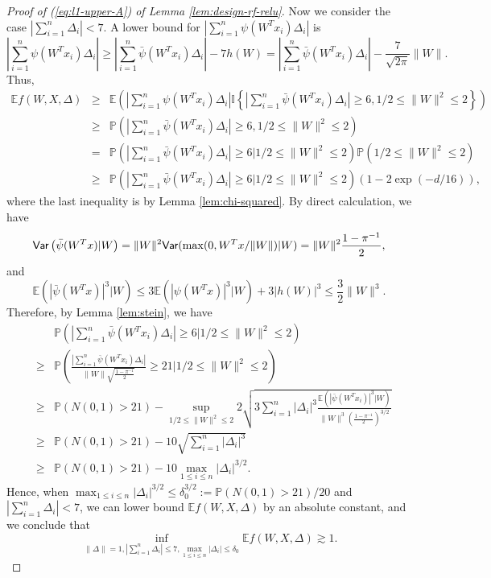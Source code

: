 \begin{proof}[Proof of (\ref{eq:l1-upper-A}) of Lemma \ref{lem:design-rf-relu}]
Now we consider the case $\left|\sum_{i=1}^n\Delta_i\right|< 7$. A lower bound for $\left|\sum_{i=1}^n\psi(W^Tx_i)\Delta_i\right|$ is
\begin{equation}
\left|\sum_{i=1}^n\psi(W^Tx_i)\Delta_i\right| \geq \left|\sum_{i=1}^n\bar{\psi}(W^Tx_i)\Delta_i\right| - 7h(W) = \left|\sum_{i=1}^n\bar{\psi}(W^Tx_i)\Delta_i\right| - \frac{7}{\sqrt{2\pi}}\|W\|. \label{eq:seven}
\end{equation}
Thus,
\begin{eqnarray*}
 \mathbb{E}f(W,X,\Delta) &\geq& \mathbb{E}\left(\left|\sum_{i=1}^n\psi(W^Tx_i)\Delta_i\right|\mathbb{I}\left\{\left|\sum_{i=1}^n\bar{\psi}(W^Tx_i)\Delta_i\right|\geq 6, 1/2\leq \|W\|^2\leq 2\right\}\right) \\
 &\geq& \mathbb{P}\left(\left|\sum_{i=1}^n\bar{\psi}(W^Tx_i)\Delta_i\right|\geq 6, 1/2\leq \|W\|^2\leq 2\right) \\
 &=& \mathbb{P}\left(\left|\sum_{i=1}^n\bar{\psi}(W^Tx_i)\Delta_i\right|\geq 6\Big|1/2\leq \|W\|^2\leq 2\right)\mathbb{P}\left(1/2\leq \|W\|^2\leq 2\right) \\
 &\geq& \mathbb{P}\left(\left|\sum_{i=1}^n\bar{\psi}(W^Tx_i)\Delta_i\right|\geq 6\Big|1/2\leq \|W\|^2\leq 2\right)\left(1-2\exp(-d/16)\right),
\end{eqnarray*}
where the last inequality is by Lemma \ref{lem:chi-squared}. By direct calculation, we have
\begin{equation}
\Var\left(\bar{\psi}(W^Tx)|W\right)=\|W\|^2\Var(\max(0,W^Tx/\|W\|)|W)=\|W\|^2\frac{1-\pi^{-1}}{2}, \label{eq:cond-var-X-W}
\end{equation}
and
$$\mathbb{E}\left(|\bar{\psi}(W^Tx)|^3|W\right) \leq 3\mathbb{E}\left(|\psi(W^Tx)|^3|W\right)+3|h(W)|^3 \leq \frac{3}{2}\|W\|^3.$$
Therefore, by Lemma \ref{lem:stein}, we have
\begin{eqnarray*}
 && \mathbb{P}\left(\left|\sum_{i=1}^n\bar{\psi}(W^Tx_i)\Delta_i\right|\geq 6\Big|1/2\leq \|W\|^2\leq 2\right) \\
 &\geq& \mathbb{P}\left(\frac{\left|\sum_{i=1}^n\bar{\psi}(W^Tx_i)\Delta_i\right|}{\|W\|\sqrt{\frac{1-\pi^{-1}}{2}}}\geq 21\Bigg|1/2\leq \|W\|^2\leq 2\right) \\
 &\geq& \mathbb{P}\left(N(0,1)>21\right) - \sup_{1/2\leq \|W\|^2\leq 2} 2\sqrt{3\sum_{i=1}^n|\Delta_i|^3\frac{\mathbb{E}\left(|\bar{\psi}(W^Tx_i)|^3|W\right)}{\|W\|^3\left(\frac{1-\pi^{-1}}{2}\right)^{3/2}}} \\
 &\geq& \mathbb{P}\left(N(0,1)>21\right) - 10\sqrt{\sum_{i=1}^n|\Delta_i|^3} \\
 &\geq& \mathbb{P}\left(N(0,1)>21\right) - 10\max_{1\leq i\leq n}|\Delta_i|^{3/2}.
\end{eqnarray*}
Hence, when $\max_{1\leq i\leq n}|\Delta_i|^{3/2}\leq \delta_0^{3/2}:=\mathbb{P}\left(N(0,1)>21\right)/20$ and $\left|\sum_{i=1}^n\Delta_i\right|< 7$, we can lower bound $\mathbb{E}f(W,X,\Delta)$ by an absolute constant, and we conclude that
\begin{equation}
\inf_{\|\Delta\|=1,|\sum_{i=1}^n\Delta_i|\leq 7, \max_{1\leq i\leq n}|\Delta_i|\leq\delta_0}\mathbb{E}f(W,X,\Delta) \gtrsim 1.\label{eq:l1-1-2-relu}
\end{equation}


\end{proof}

